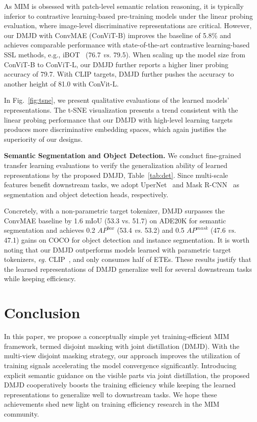 \documentclass[lettersize,journal]{IEEEtran}
\begin{document}
As MIM is obsessed with patch-level semantic relation reasoning, it is typically inferior to contrastive learning-based pre-training models under the linear probing evaluation, where image-level discriminative representations are critical.
However, our DMJD with ConvMAE (ConViT-B) improves the baseline of 5.8\% and achieves comparable performance with state-of-the-art contrastive learning-based SSL methods, e.g., iBOT~\cite{2021arXiv211107832Z} (76.7 \textit{vs.} 79.5). When scaling up the model size from ConViT-B to ConViT-L, our DMJD further reports a higher liner probing accuracy of 79.7.
With CLIP targets, DMJD further pushes the accuracy to another height of 81.0 with ConVit-L.

In Fig.~\ref{fig:tsne}, we present qualitative evaluations of the learned models' representations. The t-SNE visualization presents a trend consistent with the linear probing performance that our DMJD with high-level learning targets produces more discriminative embedding spaces, which again justifies the superiority of our designs.

\textbf{Semantic Segmentation and Object Detection.} 
We conduct fine-grained transfer learning evaluations to verify the generalization ability of learned representations by the proposed DMJD, Table~\ref{tab:det}. Since multi-scale features benefit downstream tasks, we adopt UperNet~\cite{Xiao2018UnifiedPP} and Mask R-CNN~\cite{He2020MaskR} as segmentation and object detection heads, respectively.

Concretely, with a non-parametric target tokenizer, DMJD surpasses the ConvMAE baseline by 1.6 mIoU (53.3 vs. 51.7) on ADE20K for semantic segmentation and achieves 0.2 $AP^{box}$ (53.4 \textit{vs.} 53.2) and 0.5 $AP^{mask}$ (47.6 \textit{vs.} 47.1) gains on COCO for object detection and instance segmentation. 
It is worth noting that our DMJD outperforms models learned with parametric target tokenizers, \textit{eg.} CLIP~\cite{Radford2021LearningTV}, and only consumes half of ETEs.
These results justify that the learned representations of DMJD generalize well for several downstream tasks while keeping efficiency.

\section{Conclusion}
In this paper, we propose a conceptually simple yet training-efficient MIM framework, termed disjoint masking with joint distillation (DMJD). 
With the multi-view disjoint masking strategy, our approach improves the utilization of training signals accelerating the model convergence significantly. 
Introducing explicit semantic guidance on the visible parts via joint distillation, the proposed DMJD cooperatively boosts the training efficiency while keeping the learned representations to generalize well to downstream tasks.
We hope these achievements shed new light on training efficiency research in the MIM community. 



\end{document}
